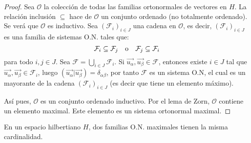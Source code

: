 \documentclass[12pt]{report}
\theoremstyle{largebreak}
\newcommand\pint[2]{\ensuremath{\left(#1\big| #2\right)}}
\begin{document}
    \begin{proof}
        Sea $\mathcal{O}$ la colección de todas las familias ortonormales de vectores en $H$. La relación inclusión $\subseteq$ hace de $\mathcal{O}$ un conjunto ordenado (no totalmente ordenado). Se verá que $\mathcal{O}$ es inductivo. Sea $\left(\mathcal{F}_i \right)_{i\in J}$ una cadena en $\mathcal{O}$, es decir, $\left(\mathcal{F}_i \right)_{i\in J}$ es una familia de sistemas O.N. tales que:
        \begin{equation*}
            \mathcal{F}_i\subseteq\mathcal{F}_j\quad\textup{o}\quad\mathcal{F}_j\subseteq\mathcal{F}_i
        \end{equation*}
        para todo $i,j\in J$. Sea $\mathcal{F}=\bigcup_{ i\in J}\mathcal{F}_i$. Si $\vec{u_\alpha},\vec{u_\beta}\in\mathcal{F}$, entonces existe $i\in J$ tal que $\vec{u_\alpha},\vec{u_\beta}\in\mathcal{F}_i$, luego $\pint{\vec{u_\alpha}}{\vec{u_\beta}}=\delta_{\alpha\beta}$, por tanto $\mathcal{F}$ es un sistema O.N, el cual es un mayorante de la cadena $\left(\mathcal{F}_i \right)_{i\in J}$ (es decir que tiene un elemento máximo).
        
        Así pues, $\mathcal{O}$ es un conjunto ordenado inductivo. Por el lema de Zorn, $\mathcal{O}$ contiene un elemento maximal. Este elemento es un sistema ortonormal maximal.
    \end{proof}

    \begin{theor}
        En un espacio hilbertiano $H$, dos familias O.N. maximales tienen la misma cardinalidad.
    \end{theor}
\end{document}
